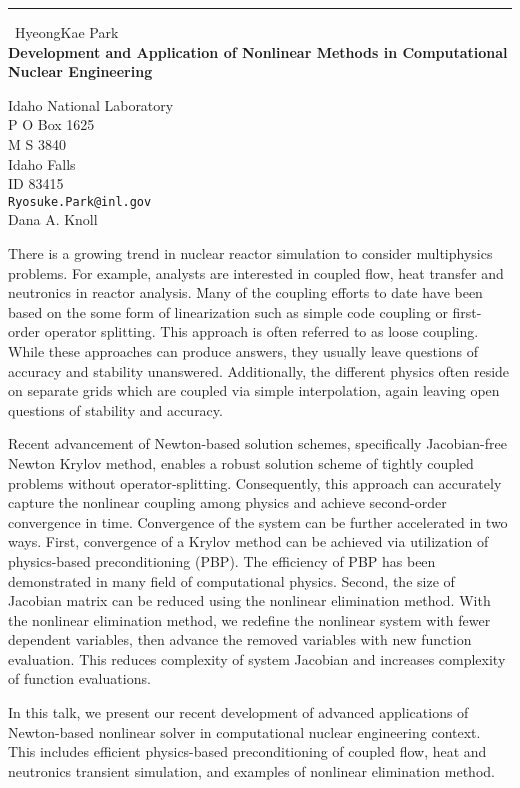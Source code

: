 \documentclass{report}
\begin{document}
\begin{center}
\rule{6in}{1pt} \
{\large HyeongKae Park \\
{\bf Development and Application of Nonlinear Methods in Computational Nuclear Engineering}}

Idaho National Laboratory \\ P O Box 1625 \\ M S 3840 \\ Idaho Falls \\ ID 83415
\\
{\tt Ryosuke.Park@inl.gov}\\
Dana A. Knoll\end{center}

There is a growing trend in nuclear reactor simulation to consider
multiphysics problems. For example, analysts are interested in coupled
flow, heat transfer and neutronics in reactor analysis. Many of the
coupling efforts to date have been based on the some form of
linearization such as simple code coupling or first-order operator
splitting. This approach is often referred to as loose coupling. While
these approaches can produce answers, they usually leave questions of
accuracy and stability unanswered. Additionally, the different physics
often reside on separate grids which are coupled via simple
interpolation, again leaving open questions of stability and accuracy.

Recent advancement of Newton-based solution schemes, specifically
Jacobian-free Newton Krylov method, enables a robust solution scheme of
tightly coupled problems without operator-splitting. Consequently, this
approach can accurately capture the nonlinear coupling among physics and
achieve second-order convergence in time. Convergence of the system can
be further accelerated in two ways. First, convergence of a Krylov method
can be achieved via utilization of physics-based preconditioning (PBP).
The efficiency of PBP has been demonstrated in many field of
computational physics. Second, the size of Jacobian matrix can be reduced
using the nonlinear elimination method. With the nonlinear elimination
method, we redefine the nonlinear system with fewer dependent variables,
then advance the removed variables with new function evaluation. This
reduces complexity of system Jacobian and increases complexity of
function evaluations.

In this talk, we present our recent development of advanced applications
of Newton-based nonlinear solver in computational nuclear engineering
context. This includes efficient physics-based preconditioning of coupled
flow, heat and neutronics transient simulation, and examples of nonlinear
elimination method.
\end{document}
